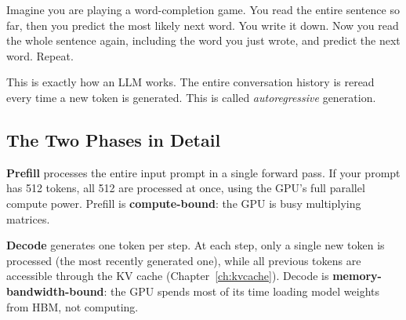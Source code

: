 \documentclass[11pt, twoside, openright]{book}
\newcommand{\analogybox}[2]{\begin{tcolorbox}[analogystyle, title={Analogy: #1}]#2\end{tcolorbox}}
\newcommand{\keyterm}[1]{\textbf{\color{AccentOrange}#1}}
\begin{document}
\analogybox{The Sentence Completion Game}{
Imagine you are playing a word-completion game.  You read the entire sentence so
far, then you predict the most likely next word.  You write it down.  Now you read
the whole sentence again, including the word you just wrote, and predict the next
word.  Repeat.

This is exactly how an LLM works.  The entire conversation history is reread every
time a new token is generated.  This is called \textit{autoregressive} generation.
}

\subsection{The Two Phases in Detail}

\keyterm{Prefill} processes the entire input prompt in a single
forward pass.  If your prompt has 512 tokens, all 512 are processed at once,
using the GPU's full parallel compute power.  Prefill is \textbf{compute-bound}:
the GPU is busy multiplying matrices.

\keyterm{Decode} generates one token per step.  At each step, only a
single new token is processed (the most recently generated one), while all
previous tokens are accessible through the KV cache (Chapter~\ref{ch:kvcache}).
Decode is \textbf{memory-bandwidth-bound}: the GPU spends most of its time loading
model weights from HBM, not computing.

\begin{center}
\end{center}
\end{document}
